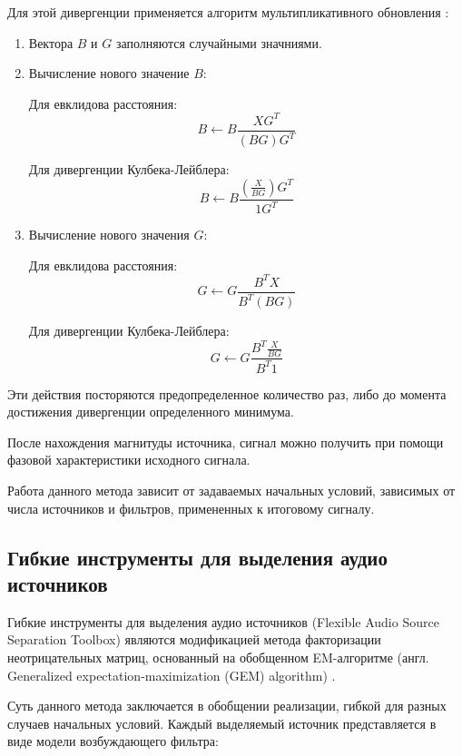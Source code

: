 Для этой дивергенции применяется алгоритм мультипликативного обновления \cite{DLee}:

\begin{enumerate}
	\item Вектора $B$ и $G$ заполняются случайными значниями.
	\item Вычисление нового значение $B$: 
	
	Для евклидова расстояния:
	\begin{equation}
	B \leftarrow B \frac{XG^T}{(BG)G^T}
	\end{equation}
	
	Для дивергенции Кулбека-Лейблера:
	\begin{equation}
	B \leftarrow B \frac{ (\frac{X}{BG}) G^T}{1G^T}
	\end{equation}
	\item Вычисление нового значения $G$:
	
	Для евклидова расстояния:
	\begin{equation}
	G \leftarrow G \frac{B^T X}{B^T (BG)}
	\end{equation}
	
	Для дивергенции Кулбека-Лейблера:
	\begin{equation}
	G \leftarrow G \frac{B^T \frac{X}{BG}}{B^T1}
	\end{equation}
\end{enumerate}

Эти действия посторяются предопределенное количество раз, либо до момента достижения дивергенции определенного минимума.

После нахождения магнитуды источника, сигнал можно получить при помощи фазовой характеристики исходного сигнала. 

Работа данного метода зависит от задаваемых начальных условий, зависимых от числа источников и фильтров, примененных к итоговому сигналу.

\subsection{Гибкие инструменты для выделения аудио источников}

Гибкие инструменты для выделения аудио источников (Flexible Audio Source Separation Toolbox) являются модификацией метода факторизации неотрицательных матриц, основанный на обобщенном EM-алгоритме (англ. Generalized expectation-maximization (GEM) algorithm) \cite{ozerov}. 

Суть данного метода заключается в обобщении реализации, гибкой для разных случаев начальных условий. Каждый выделяемый источник представляется в виде модели возбуждающего фильтра:

